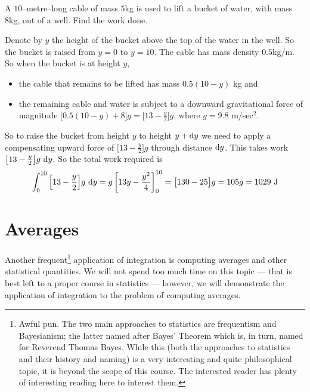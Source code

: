 \begin{eg}\label{eg:WKcable}
A $10$--metre--long cable of mass $5$kg is used to lift a bucket of water,
with mass 8kg, out of a well. Find the work done.

\soln
Denote by $y$ the height of the bucket above the top of the water in the well.
So the bucket is raised from $y=0$ to $y=10$. The cable has mass density
$0.5$kg/m. So when the bucket is at height $y$,
\begin{itemize}\itemsep1pt \parskip0pt  %
\item the cable that remains to be lifted has mass $0.5(10-y)$ kg and
\item the remaining cable and water is subject to a downward gravitational
force of magnitude $\big[0.5(10-y) + 8\big]g=\big[13-\frac{y}{2}\big]g$,
where $g=9.8$ m/sec$^2$.
\end{itemize}
So to raise the bucket from height $y$ to height $y+\mathrm{d}y$ we need
to apply a compensating upward force of $\big[13-\frac{y}{2}\big]g$
through distance $\mathrm{d}y$. This takes work
$\big[13-\frac{y}{2}\big]g\ \dee{y}$.
So the total work required is
\begin{equation*}
\int_0^{10}\Big[13-\frac{y}{2}\Big]g\ \mathrm{d}y
=g\left[13 y-\frac{y^2}{4}\right]_0^{10}
=\big[130-25\big]g
=105 g
=1029\ \mathrm{J}
\end{equation*}

\end{eg}


\section{Averages}\label{sec avg}
\newcommand{\ave}{\mathrm{ave}}
\newcommand{\llt}{\left<}
\newcommand{\rgt}{\right>}

Another frequent\footnote{Awful pun. The two main approaches to statistics are
frequentism and Bayesianism; the latter named after Bayes' Theorem which is, in turn,
named for Reverend Thomas Bayes. While this (both the approaches to statistics
and their history and naming) is a very interesting and quite
philosophical topic, it is beyond the scope of this course. The interested reader has
plenty of interesting reading here to interest them.} application of integration is
computing averages and other statistical quantities. We will not spend too much time on
this topic --- that is best left to a proper course in statistics --- however, we will
demonstrate the application of integration to the problem of computing averages.

